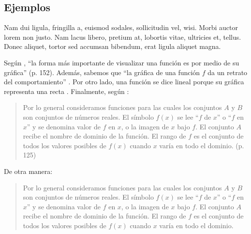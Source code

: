 \documentclass[11pt]{article}
\begin{document}
\subsection{Ejemplos}

Nam dui ligula, fringilla a, euismod sodales, sollicitudin vel, wisi. Morbi auctor lorem non justo. Nam lacus libero, pretium at, lobortis vitae, ultricies et, tellus. Donec aliquet, tortor sed accumsan bibendum, erat ligula aliquet magna.

Según \textcite{stewartpre}, ``la forma más importante de visualizar una función es por medio de su gráfica'' (p. 152). Además, sabemos que ``la gráfica de una función $f$ da un retrato del comportamiento'' \parencite[p. 153]{stewartpre}. Por otro lado, una función se dice lineal porque su gráfica representa una recta \parencite{stewartpre}. Finalmente, según \textcite{stewartpre}:
\begin{quote}
    Por lo general consideramos funciones para las cuales los conjuntos $A$ y $B$ son conjuntos de números reales. El símbolo $f(x)$ se lee “$f$ de $x$” o “$f$ en $x$” y se denomina valor de $f$ en $x$, o la imagen de $x$ bajo $f$. El conjunto $A$ recibe el nombre de dominio de la función. El rango de $f$ es el conjunto de todos los valores posibles de $f(x)$ cuando $x$ varía en todo el dominio. (p. 125)
\end{quote}

De otra manera:
\begin{quote}
    Por lo general consideramos funciones para las cuales los conjuntos $A$ y $B$ son conjuntos de números reales. El símbolo $f(x)$ se lee “$f$ de $x$” o “$f$ en $x$” y se denomina valor de $f$ en $x$, o la imagen de $x$ bajo $f$. El conjunto $A$ recibe el nombre de dominio de la función. El rango de $f$ es el conjunto de todos los valores posibles de $f(x)$ cuando $x$ varía en todo el dominio. \parencite[p. 125]{stewartpre}
\end{quote}

\nocite{*}
\printbibliography
\end{document}
